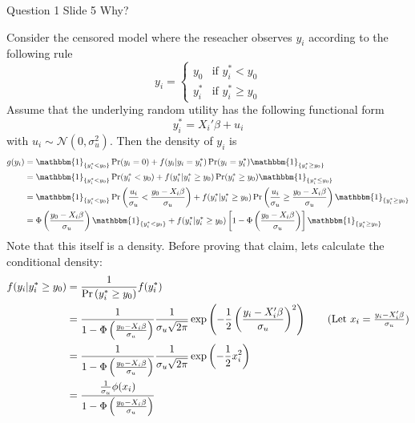 \documentclass{article}
\begin{document}
\begin{problem}{Question 1 Slide 5}
Why?
\end{problem}
\begin{solution}
Consider the censored model where the reseacher observes $y_i$ according to the following rule 
\begin{equation*}
    y_i = \begin{cases}
        y_0 &\mbox{if } y^*_i< y_0 \\ 
        y_i^* &\mbox{if } y^*_i\geq y_0
    \end{cases}
\end{equation*}
Assume that the underlying random utility has the following functional form
\begin{equation*}
 y_i^* = X_i'\beta + u_i
\end{equation*}
with $u_i\sim\mathcal{N}(0,\sigma_u^2)$. Then the density of $y_i$ is 
\begin{align*}
    g(y_i) &= \mathbbm{1}_{\{y_i^*<y_0\}}\Pr(y_i=0) + f(y_i\vert y_i=y_i^*)\Pr(y_i = y_i^*)\mathbbm{1}_{\{y_i^*\geq y_0\}} \\ 
    &= \mathbbm{1}_{\{y_i^*<y_0\}}\Pr(y_i^*<y_0) + f(y_i^*\vert y_i^*\geq y_0)\Pr(y_i^*\geq y_0)\mathbbm{1}_{\{y_i^*\leq y_0\}} \\
    &= \mathbbm{1}_{\{y_i^*<y_0\}}\Pr\left(\frac{u_i}{\sigma_u}<\frac{y_0-X_i\beta}{\sigma_u}\right) + f(y_i^*\vert y_i^*\geq y_0)\Pr\left(\frac{u_i}{\sigma_u}\geq\frac{y_0-X_i\beta}{\sigma_u}\right)\mathbbm{1}_{\{y_i^*\geq y_0\}} \\ 
    &= \Phi\left(\frac{y_0-X_i\beta}{\sigma_u}\right)\mathbbm{1}_{\{y_i^*<y_0\}} + f(y_i^*\vert y_i^*\geq y_0)\left[1-\Phi\left(\frac{y_0-X_i\beta}{\sigma_u}\right)\right]\mathbbm{1}_{\{y_i^*\geq y_0\}}
\end{align*}
Note that this itself is a density. Before proving that claim, lets calculate the conditional density:
\begin{align*}
    f(y_i\vert y_i^*\geq y_0) &= \frac{1}{\Pr\left(y_i^*\geq y_0\right)}f(y_i^*) \\ 
    &= \frac{1}{1-\Phi\left(\frac{y_0-X_i\beta}{\sigma_u}\right)} \frac{1}{\sigma_u\sqrt{2\pi}} \exp\left(-\frac{1}{2}\left(\frac{y_i-X_i'\beta}{\sigma_u}\right)^2\right) \tag{Let $x_i=\frac{y_i-X_i'\beta}{\sigma_u}$} \\ 
    &= \frac{1}{1-\Phi\left(\frac{y_0-X_i\beta}{\sigma_u}\right)} \frac{1}{\sigma_u\sqrt{2\pi}} \exp\left(-\frac{1}{2}x_i^2\right) \\
     &= \frac{\frac{1}{\sigma_u}\phi(x_i)}{1-\Phi\left(\frac{y_0-X_i\beta}{\sigma_u}\right)}

\end{align*}
\end{solution}
\end{document}
